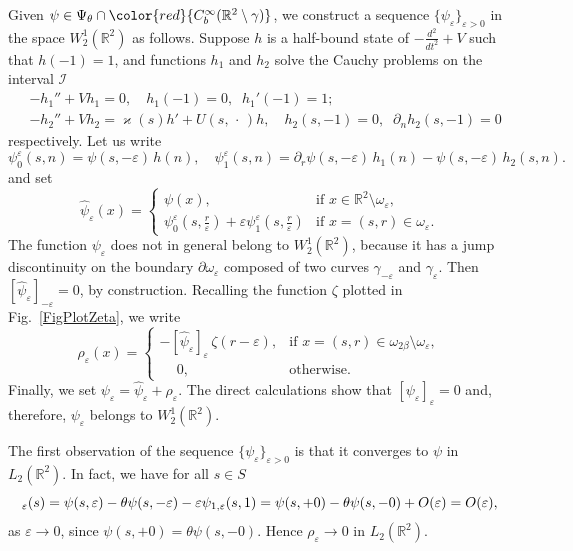 \documentclass[reqno]{amsart}
\theoremstyle{plain}
\numberwithin{equation}{section}
\renewcommand{\kappa}{\varkappa}
\newcommand{\Real}{\mathbb R}
\newcommand{\eps}{\varepsilon}
\newcommand{\cI}{\mathcal{I}}
\newcommand{\rd}[1]{{\color{red}{#1}}}
\begin{document}
Given $\psi\in \Psi_\theta\cap \rd{C_b^\infty(\Real^2\setminus \gamma)}$, we construct a sequence $\{\psi_\eps\}_{\eps>0}$ in the space $W_2^1(\Real^2)$ as follows. Suppose $h$ is a half-bound state of $-\frac{d^2}{d t^2}+V$
such that $h(-1)=1$, and
functions $h_1$ and $h_2$ solve the Cauchy problems on the interval $\cI$
\begin{align}\label{ProblemH1}
&-h_1''+Vh_1=0,\quad  h_1(-1)=0, \;\; h_1'(-1)=1;
\\\label{ProblemH2}
& -h_2''+Vh_2=\kappa(s)h'+U(s,\,\cdot\,)h,\quad
h_2(s,-1)=0, \;\; \partial_n h_2(s,-1)=0
\end{align}
respectively. Let us write
\begin{equation*}
  \psi_0^\eps(s,n)=\psi(s,-\eps)\,h(n), \quad
  \psi_1^\eps(s,n)=\partial_r\psi(s,-\eps)\,h_1(n)
     -\psi(s,-\eps)\,h_2(s,n).
\end{equation*}
and set
\begin{equation*}
  \hat{\psi}_\eps(x)=
  \begin{cases}
    \psi(x), & \text{if } x\in \Real^2\setminus \omega_\eps,\\
     \psi_0^\eps(s,\tfrac{r}{\eps})
     +\eps \psi_1^\eps\left(s,\tfrac{r}{\eps}\right)& \text{if } x=(s,r)\in \omega_\eps.
  \end{cases}
\end{equation*}
The function $\psi_\eps$ does not in general belong to $W_2^1(\Real^2)$, because it  has a jump discontinuity on the boundary $\partial\omega_\eps$ composed of two curves $\gamma_{-\eps}$ and $\gamma_{\eps}$. Then $[\hat{\psi}_\eps]_{-\eps}=0$, by construction.  Recalling the function $\zeta$ plotted in Fig.~\ref{FigPlotZeta}, we write
\begin{equation*}
\rho_\eps(x)=
\begin{cases}
  -[\hat{\psi}_\eps]_{\eps}\,\zeta(r-\eps),& \text{if }x=(s,r)\in
  \omega_{2\beta}\setminus \omega_\eps,\\
  \phantom{-}0,& \text{otherwise}.
\end{cases}
\end{equation*}
Finally, we set $\psi_\eps=\hat{\psi}_\eps+\rho_\eps$.
The direct calculations show that $[\psi_\eps]_{\eps}=0$  and, therefore, $\psi_\eps$ belongs to $W_2^1(\Real^2)$.

The first observation of the sequence $\{\psi_\eps\}_{\eps>0}$ is that it converges to $\psi$ in $L_2(\Real^2)$. In fact,  we have  for all $s\in S$
\begin{equation*}
   [\hat{\psi}_\eps]_{\eps}(s)=\psi(s,\eps)-\theta\psi(s,-\eps)-\eps \psi_{1,\eps}(s,1)\\
  =
  \psi(s,+0)-\theta\psi(s,-0)+O(\eps)=O(\eps),
\end{equation*}
as  $\eps\to 0$, since $\psi(s,+0)=\theta\psi(s,-0)$. Hence $\rho_\eps\to 0$  in $L_2(\Real^2)$.
\end{document}
